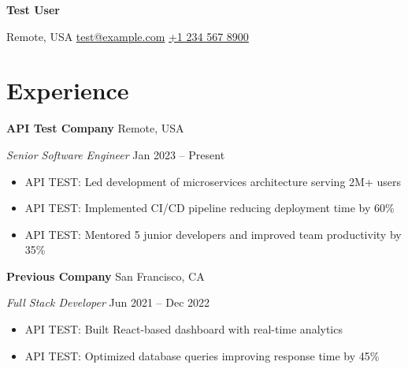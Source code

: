 \documentclass[letterpaper,11pt]{article}
\begin{document}
\begin{center}
    {\Large\textbf{Test User}}\\[6pt]
    \hrulefill
\end{center}
\begin{center}
    Remote, USA {\large\textbullet} \href{mailto:test@example.com}{test@example.com} {\large\textbullet} \href{tel:+1 234 567 8900}{+1 234 567 8900}
\end{center}


\section{Experience}
\textbf{API Test Company} \hfill Remote, USA

\textit{Senior Software Engineer} \hfill Jan 2023 -- Present

\begin{itemize}[leftmargin=*,itemsep=2pt,parsep=2pt,topsep=4pt]
    \item API TEST: Led development of microservices architecture serving 2M+ users
    \item API TEST: Implemented CI/CD pipeline reducing deployment time by 60\%
    \item API TEST: Mentored 5 junior developers and improved team productivity by 35\%
\end{itemize}
\vspace{10pt}
\textbf{Previous Company} \hfill San Francisco, CA

\textit{Full Stack Developer} \hfill Jun 2021 -- Dec 2022

\begin{itemize}[leftmargin=*,itemsep=2pt,parsep=2pt,topsep=4pt]
    \item API TEST: Built React-based dashboard with real-time analytics
    \item API TEST: Optimized database queries improving response time by 45\%
\end{itemize}
\end{document}
